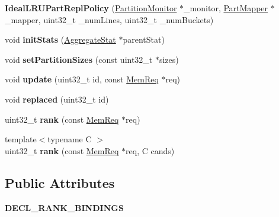\begin{DoxyCompactItemize}
\item 
\hypertarget{classIdealLRUPartReplPolicy_a76f9677a013029f467ae6289b9bb51af}{{\bfseries Ideal\-L\-R\-U\-Part\-Repl\-Policy} (\hyperlink{classPartitionMonitor}{Partition\-Monitor} $\ast$\-\_\-monitor, \hyperlink{classPartMapper}{Part\-Mapper} $\ast$\-\_\-mapper, uint32\-\_\-t \-\_\-num\-Lines, uint32\-\_\-t \-\_\-num\-Buckets)}\label{classIdealLRUPartReplPolicy_a76f9677a013029f467ae6289b9bb51af}

\item 
\hypertarget{classIdealLRUPartReplPolicy_a005d5fcb68c06b418eb0ccebcebcd833}{void {\bfseries init\-Stats} (\hyperlink{classAggregateStat}{Aggregate\-Stat} $\ast$parent\-Stat)}\label{classIdealLRUPartReplPolicy_a005d5fcb68c06b418eb0ccebcebcd833}

\item 
\hypertarget{classIdealLRUPartReplPolicy_acf0338dd7fa8e41ba79f1941aa60a67c}{void {\bfseries set\-Partition\-Sizes} (const uint32\-\_\-t $\ast$sizes)}\label{classIdealLRUPartReplPolicy_acf0338dd7fa8e41ba79f1941aa60a67c}

\item 
\hypertarget{classIdealLRUPartReplPolicy_a8d1da4cc3170f608737c400221114ac5}{void {\bfseries update} (uint32\-\_\-t id, const \hyperlink{structMemReq}{Mem\-Req} $\ast$req)}\label{classIdealLRUPartReplPolicy_a8d1da4cc3170f608737c400221114ac5}

\item 
\hypertarget{classIdealLRUPartReplPolicy_a9c5af0e93e754830f267fa9a5e81967c}{void {\bfseries replaced} (uint32\-\_\-t id)}\label{classIdealLRUPartReplPolicy_a9c5af0e93e754830f267fa9a5e81967c}

\item 
\hypertarget{classIdealLRUPartReplPolicy_a1b346d9edf01a4b38720782ef261ebba}{uint32\-\_\-t {\bfseries rank} (const \hyperlink{structMemReq}{Mem\-Req} $\ast$req)}\label{classIdealLRUPartReplPolicy_a1b346d9edf01a4b38720782ef261ebba}

\item 
\hypertarget{classIdealLRUPartReplPolicy_ae8d8a5ab116569a643ff191bb4848a59}{{\footnotesize template$<$typename C $>$ }\\uint32\-\_\-t {\bfseries rank} (const \hyperlink{structMemReq}{Mem\-Req} $\ast$req, C cands)}\label{classIdealLRUPartReplPolicy_ae8d8a5ab116569a643ff191bb4848a59}

\end{DoxyCompactItemize}
\subsection*{Public Attributes}
\begin{DoxyCompactItemize}
\item 
\hypertarget{classIdealLRUPartReplPolicy_a2f7060fb9a38de21c7312d17bcd0eb0d}{{\bfseries D\-E\-C\-L\-\_\-\-R\-A\-N\-K\-\_\-\-B\-I\-N\-D\-I\-N\-G\-S}}\label{classIdealLRUPartReplPolicy_a2f7060fb9a38de21c7312d17bcd0eb0d}

\end{DoxyCompactItemize}
